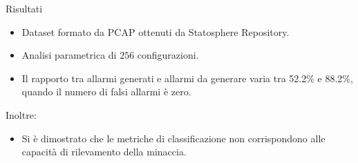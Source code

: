 \begin{frame}{Risultati}
  \begin{itemize}
    \item Dataset formato da \ac{PCAP} ottenuti da Statosphere Repository.
    \item Analisi parametrica di $256$ configurazioni.
    \item Il rapporto tra allarmi generati e allarmi da generare varia tra 52.2\% e 88.2\%, quando il numero di falsi allarmi è zero.
  \end{itemize}

  Inoltre:
  \begin{itemize}
    \item Si è dimostrato che le metriche di classificazione non corrispondono alle capacità di rilevamento della minaccia.
  \end{itemize}

\end{frame}


